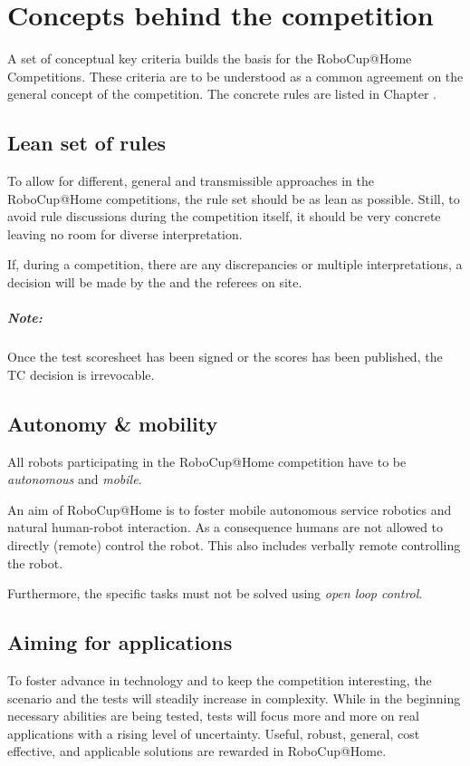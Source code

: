 \chapter{Concepts behind the competition}
\label{chap:concepts}
A set of conceptual key criteria builds the basis for the RoboCup@Home Competitions. These
criteria are to be understood as a common agreement on the general concept of the competition.
The concrete rules are listed in Chapter .

\section{Lean set of rules}
\label{concept:lean_set_of_rules}
To allow for different, general and transmissible approaches in the RoboCup@Home competitions, the rule set should be as lean as possible. Still, to avoid rule discussions during the competition itself, it should be very concrete leaving no room for diverse interpretation.

If, during a competition, there are any discrepancies or multiple interpretations, a decision will be made by the  and the referees on site.

\paragraph*{Note: } Once the test scoresheet has been signed or the scores has been published, the TC decision is irrevocable.

\section{Autonomy \& mobility}
\label{concept:autonomy_and_mobility}
All robots participating in the RoboCup@Home competition have to be \emph{autonomous} and \emph{mobile}.

An aim of RoboCup@Home is to foster mobile autonomous service robotics and natural human-robot interaction. As a consequence humans are not allowed to directly (remote) control the robot. This also includes verbally remote controlling the robot.

Furthermore, the specific tasks must not be solved using \emph{open loop control}.

\section{Aiming for applications}
\label{concept:aiming_for_applications}
To foster advance in technology and to keep the competition interesting, the scenario and the tests will steadily increase in complexity. While in the beginning necessary abilities are being tested, tests will focus more and more on real applications with a rising level of uncertainty. Useful, robust, general, cost effective, and applicable solutions are rewarded in RoboCup@Home.

